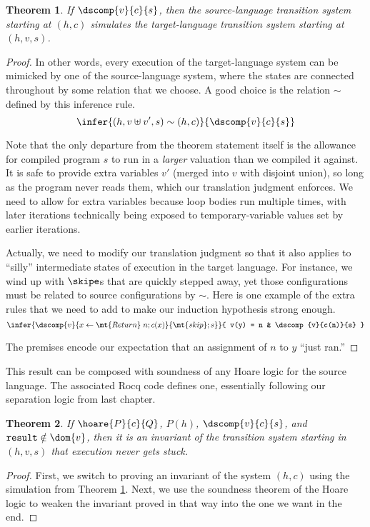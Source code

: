 \documentclass{amsbook}
\newtheorem{theorem}{Theorem}[chapter]
\theoremstyle{definition}
\theoremstyle{remark}
\numberwithin{section}{chapter}
\numberwithin{equation}{chapter}
\begin{document}
\begin{theorem}\label{dscompsim}
  If $\dscomp{v}{c}{s}$, then the source-language transition system starting at $(h, c)$ simulates the target-language transition system starting at $(h, v, s)$.
\end{theorem}
\begin{proof}
  In other words, every execution of the target-language system can be mimicked by one of the source-language system, where the states are connected throughout by some relation that we choose.
  A good choice is the relation $\sim$ defined by this inference rule.
  $$\infer{(h, v \uplus v', s) \sim (h, c)}{
    \dscomp{v}{c}{s}
  }$$

  Note that the only departure from the theorem statement itself is the allowance for compiled program $s$ to run in a \emph{larger} valuation than we compiled it against.
  It is safe to provide extra variables $v'$ (merged into $v$ with disjoint union), so long as the program never reads them, which our translation judgment enforces.
  We need to allow for extra variables because loop bodies run multiple times, with later iterations technically being exposed to temporary-variable values set by earlier iterations.

  Actually, we need to modify our translation judgment so that it also applies to ``silly'' intermediate states of execution in the target language.
  For instance, we wind up with $\skipe$s that are quickly stepped away, yet those configurations must be related to source configurations by $\sim$.
  Here is one example of the extra rules that we need to add to make our induction hypothesis strong enough.
  $$\infer{\dscomp{v}{x \leftarrow \mt{Return} \; n; c(x)}{\mt{skip}; s}}{
    v(y) = n
    & \dscomp{v}{c(n)}{s}
  }$$

  The premises encode our expectation that an assignment of $n$ to $y$ ``just ran.''
\end{proof}

This result can be composed with soundness of any Hoare logic for the source language.
The associated Rocq code defines one, essentially following our separation logic from last chapter.

\begin{theorem}
  If $\hoare{P}{c}{Q}$, $P(h)$, $\dscomp{v}{c}{s}$, and $\texttt{result} \notin \dom{v}$, then it is an invariant of the transition system starting in $(h, v, s)$ that execution never gets stuck.
\end{theorem}
\begin{proof}
  First, we switch to proving an invariant of the system $(h, c)$ using the simulation from Theorem \ref{dscompsim}.
  Next, we use the soundness theorem of the Hoare logic to weaken the invariant proved in that way into the one we want in the end.
\end{proof}
\end{document}
